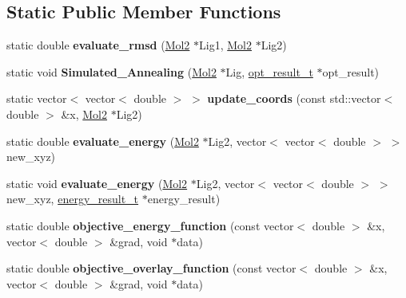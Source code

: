\subsection*{Static Public Member Functions}
\begin{DoxyCompactItemize}
\item 
\hypertarget{classOptimizer_a7afdce3d26b60974488ed46779db8301}{
static double {\bfseries evaluate\_\-rmsd} (\hyperlink{classMol2}{Mol2} $\ast$Lig1, \hyperlink{classMol2}{Mol2} $\ast$Lig2)}
\label{classOptimizer_a7afdce3d26b60974488ed46779db8301}

\item 
\hypertarget{classOptimizer_a340041cdd7ec2f6de4954bf260d17ae9}{
static void {\bfseries Simulated\_\-Annealing} (\hyperlink{classMol2}{Mol2} $\ast$Lig, \hyperlink{structOptimizer_1_1opt__result__t}{opt\_\-result\_\-t} $\ast$opt\_\-result)}
\label{classOptimizer_a340041cdd7ec2f6de4954bf260d17ae9}

\item 
\hypertarget{classOptimizer_ad8fa14f155db9108dfc9744a69c4bf11}{
static vector$<$ vector$<$ double $>$ $>$ {\bfseries update\_\-coords} (const std::vector$<$ double $>$ \&x, \hyperlink{classMol2}{Mol2} $\ast$Lig2)}
\label{classOptimizer_ad8fa14f155db9108dfc9744a69c4bf11}

\item 
\hypertarget{classOptimizer_a10878c5f4c187227c9ac2b92278a789b}{
static double {\bfseries evaluate\_\-energy} (\hyperlink{classMol2}{Mol2} $\ast$Lig2, vector$<$ vector$<$ double $>$ $>$ new\_\-xyz)}
\label{classOptimizer_a10878c5f4c187227c9ac2b92278a789b}

\item 
\hypertarget{classOptimizer_a8ecb4e920938808d1a036a58ee7ec931}{
static void {\bfseries evaluate\_\-energy} (\hyperlink{classMol2}{Mol2} $\ast$Lig2, vector$<$ vector$<$ double $>$ $>$ new\_\-xyz, \hyperlink{structenergy__result__t}{energy\_\-result\_\-t} $\ast$energy\_\-result)}
\label{classOptimizer_a8ecb4e920938808d1a036a58ee7ec931}

\item 
\hypertarget{classOptimizer_a7ec8537c088066c81a00e56e51803dda}{
static double {\bfseries objective\_\-energy\_\-function} (const vector$<$ double $>$ \&x, vector$<$ double $>$ \&grad, void $\ast$data)}
\label{classOptimizer_a7ec8537c088066c81a00e56e51803dda}

\item 
\hypertarget{classOptimizer_a104c35bbafe56b8dec183644191e455a}{
static double {\bfseries objective\_\-overlay\_\-function} (const vector$<$ double $>$ \&x, vector$<$ double $>$ \&grad, void $\ast$data)}
\label{classOptimizer_a104c35bbafe56b8dec183644191e455a}


\end{DoxyCompactItemize}
